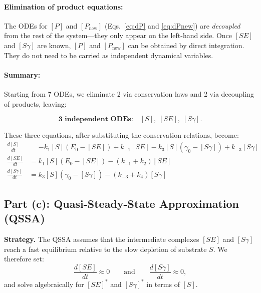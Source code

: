 \documentclass[12pt]{article}
\newcommand{\ddt}[1]{\frac{d[#1]}{dt}}
\begin{document}
\paragraph{Elimination of product equations:}
The ODEs for $[P]$ and $[P_{\text{new}}]$ (Eqs.\ \ref{eq:dP} and \ref{eq:dPnew}) are
\emph{decoupled} from the rest of the system---they only appear on the left-hand side. Once
$[SE]$ and $[S\gamma]$ are known, $[P]$ and $[P_{\text{new}}]$ can be obtained by direct
integration. They do not need to be carried as independent dynamical variables.

\paragraph{Summary:}
Starting from 7 ODEs, we eliminate 2 via conservation laws and 2 via decoupling of products,
leaving:

\begin{mdframed}[style=keyresult]
\[
  \boxed{\textbf{3 independent ODEs:} \quad [S],\; [SE],\; [S\gamma].}
\]
\end{mdframed}

These three equations, after substituting the conservation relations, become:
\begin{align}
  \ddt{S} &= -k_1[S](E_0 - [SE]) + k_{-1}[SE] - k_3[S](\gamma_0 - [S\gamma]) + k_{-3}[S\gamma] \\
  \ddt{SE} &= k_1[S](E_0 - [SE]) - (k_{-1} + k_2)[SE] \\
  \ddt{S\gamma} &= k_3[S](\gamma_0 - [S\gamma]) - (k_{-3} + k_4)[S\gamma]
\end{align}

\medskip

\subsection*{Part (c): Quasi-Steady-State Approximation (QSSA)}

\begin{mdframed}[style=solutionbox]
\textbf{\color{solutiongreen}Strategy.}
The QSSA assumes that the intermediate complexes $[SE]$ and $[S\gamma]$ reach a fast
equilibrium relative to the slow depletion of substrate $S$. We therefore set:
\[
  \frac{d[SE]}{dt} \approx 0 \qquad \text{and} \qquad \frac{d[S\gamma]}{dt} \approx 0,
\]
and solve algebraically for $[SE]^*$ and $[S\gamma]^*$ in terms of $[S]$.
\end{mdframed}
\end{document}

